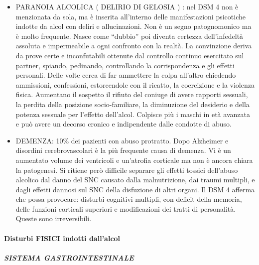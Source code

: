 \begin{itemize}
\item PARANOIA ALCOLICA ( DELIRIO DI GELOSIA ) : nel DSM 4 non è menzionata
da sola, ma è inserita all'interno delle manifestazioni psicotiche
indotte da alcol con deliri e allucinazioni. Non è un segno
patognomonico ma è molto frequente. Nasce come ``dubbio'' poi diventa
certezza dell'infedeltà assoluta e impermeabile a ogni confronto con la
realtà. La convinzione deriva da prove certe e inconfutabili ottenute
dal controllo continuo esercitato sul partner, spiando, pedinando,
controllando la corrispondenza e gli effetti personali. Delle volte
cerca di far ammettere la colpa all'altro chiedendo ammissioni,
confessioni, estorcendole con il ricatto, la coercizione e la violenza
fisica. Aumentano il sospetto il rifiuto del coniuge di avere rapporti
sessuali, la perdita della posizione socio-familiare, la diminuzione del
desiderio e della potenza sessuale per l'effetto dell'alcol. Colpisce
più i maschi in età avanzata e può avere un decorso cronico e
indipendente dalle condotte di abuso.

\item DEMENZA: 10\% dei pazienti con abuso protratto. Dopo Alzheimer e
disordini cerebrovascolari è la più frequente causa di demenza. Vi è un
aumentato volume dei ventricoli e un'atrofia corticale ma non è ancora
chiara la patogenesi. Si ritiene però difficile separare gli effetti
tossici dell'abuso alcolico dal danno del SNC causato dalla
malnutrizione, dai traumi multipli, e dagli effetti dannosi sul SNC
della disfuzione di altri organi. Il DSM 4 afferma che possa provocare:
disturbi cognitivi multipli, con deficit della memoria, delle funzioni
corticali superiori e modificazioni dei tratti di personalità. Queste
sono irreversibili.
\end{itemize}


\paragraph{Disturbi FISICI indotti dall'alcol}

\subparagraph{SISTEMA GASTROINTESTINALE}


